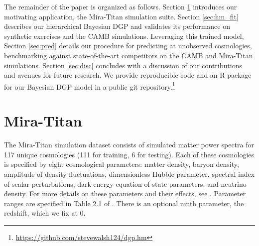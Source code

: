 \documentclass[11pt]{article}
\begin{document}
The remainder of the paper is organized as follows.  Section \ref{sec:data} 
introduces our motivating application, the Mira-Titan simulation suite.  
Section \ref{sec:hm_fit} describes our hierarchical Bayesian DGP and 
validates its performance on synthetic exercises and the CAMB simulations.  
Leveraging this trained model, Section \ref{sec:pred} details 
our procedure for predicting at unobserved cosmologies, benchmarking against
state-of-the-art competitors on the CAMB and Mira-Titan simulations. 
Section \ref{sec:disc} concludes with a discussion of our contributions and avenues for 
future research.  We provide reproducible code and an {\sf R} package for our 
Bayesian DGP model in a public git repository.\footnote{\url{https://github.com/stevewalsh124/dgp.hm}}



\section{Mira-Titan}
\label{sec:data}

The Mira-Titan simulation dataset consists of simulated matter power spectra for 
117 unique cosmologies (111 for training, 6 for testing). 
Each of these cosmologies is specified by eight cosmological 
parameters: matter density, baryon density, amplitude of density fluctuations, 
dimensionless Hubble parameter, spectral index of scalar perturbations,
dark energy equation of state parameters, and neutrino density. For more details 
on these parameters and their effects, see \cite{dodelson2020modern, aghanim2020planck, heitmann2016mira}. 
Parameter ranges are specified in Table 2.1 of \cite{moran2023mira}.
There is an optional ninth parameter, the redshift, which we fix at 0.
\end{document}
